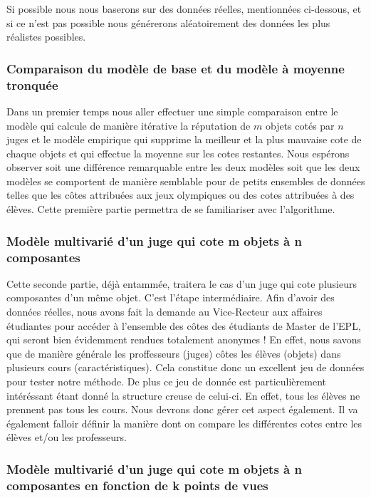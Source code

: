 \documentclass[12pt,a4paper,notitlepage]{article}
\begin{document}
Si possible nous nous baserons sur des données réelles, mentionnées ci-dessous, et si ce n'est pas possible nous générerons aléatoirement des données les plus réalistes possibles.

\subsubsection*{Comparaison du modèle de base et du modèle à moyenne tronquée}

Dans un premier temps nous aller effectuer une simple comparaison entre le modèle qui calcule de manière itérative la réputation de $m$ objets cotés par $n$ juges et le modèle empirique qui supprime la meilleur et la plus mauvaise cote de chaque objets et qui effectue la moyenne sur les cotes restantes. Nous espérons observer soit une différence remarquable entre les deux modèles soit que les deux modèles se comportent de manière semblable pour de petits ensembles de données telles que les côtes attribuées aux jeux olympiques ou des cotes attribuées à des élèves. Cette première partie permettra de se familiariser avec l'algorithme.

\subsubsection*{Modèle multivarié d'un juge qui cote m objets à n composantes}

Cette seconde partie, déjà entammée, traitera le cas d'un juge qui cote plusieurs composantes d'un même objet. C'est l'étape intermédiaire. Afin d'avoir des données réelles, nous avons fait la demande au Vice-Recteur aux affaires étudiantes pour accéder à l'ensemble des côtes des étudiants de Master de l'EPL, qui seront bien évidemment rendues totalement anonymes ! En effet, nous savons que de manière générale les proffesseurs (juges) côtes les élèves (objets) dans plusieurs cours (caractéristiques). Cela constitue donc un excellent jeu de données pour tester notre méthode. De plus ce jeu de donnée est particulièrement intéréssant étant donné la structure creuse de celui-ci. En effet, tous les élèves ne prennent pas tous les cours. Nous devrons donc gérer cet aspect également. Il va également falloir définir la manière dont on compare les différentes cotes entre les élèves et/ou les professeurs.

\subsubsection*{Modèle multivarié d'un juge qui cote m objets à n composantes en fonction de k points de vues}
\end{document}
